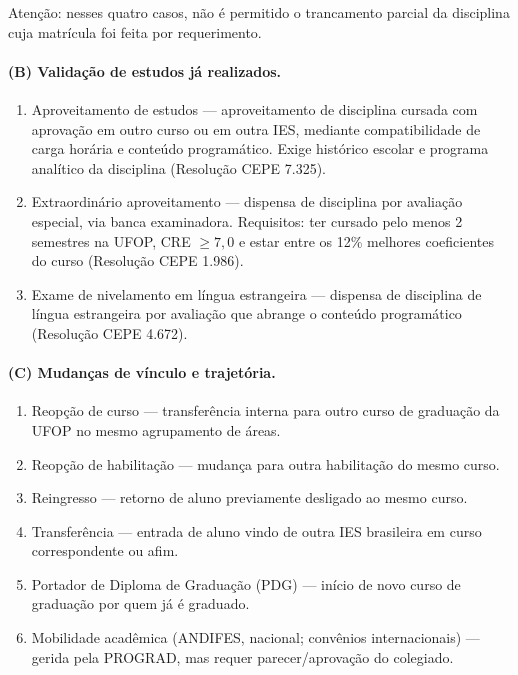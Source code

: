 \documentclass[10pt,a4paper]{extarticle}
\newcommand{\impt}[1]{\textcolor{important}{#1}}
\newcommand{\ntc}[1]{\textcolor{notice}{#1}}
\begin{document}
\ntc{Atenção: nesses quatro casos, \impt{não é permitido o trancamento parcial} da disciplina cuja matrícula foi feita por requerimento.}

\paragraph{(B) Validação de estudos já realizados.}

\begin{enumerate}[label=(\arabic*), resume]
    \item \impt{Aproveitamento de estudos} --- aproveitamento de disciplina cursada com aprovação em outro curso ou em outra IES, mediante compatibilidade de carga horária e conteúdo programático. Exige histórico escolar e programa analítico da disciplina (Resolução CEPE 7.325).
    \item \impt{Extraordinário aproveitamento} --- dispensa de disciplina por avaliação especial, via banca examinadora. Requisitos: ter cursado pelo menos 2 semestres na UFOP, CRE $\geq 7{,}0$ e estar entre os 12\% melhores coeficientes do curso (Resolução CEPE 1.986).
    \item \impt{Exame de nivelamento em língua estrangeira} --- dispensa de disciplina de língua estrangeira por avaliação que abrange o conteúdo programático (Resolução CEPE 4.672).
\end{enumerate}

\paragraph{(C) Mudanças de vínculo e trajetória.}

\begin{enumerate}[label=(\arabic*), resume]
    \item \impt{Reopção de curso} --- transferência interna para outro curso de graduação da UFOP no mesmo agrupamento de áreas.
    \item \impt{Reopção de habilitação} --- mudança para outra habilitação do mesmo curso.
    \item \impt{Reingresso} --- retorno de aluno previamente desligado ao mesmo curso.
    \item \impt{Transferência} --- entrada de aluno vindo de outra IES brasileira em curso correspondente ou afim.
    \item \impt{Portador de Diploma de Graduação (PDG)} --- início de novo curso de graduação por quem já é graduado.
    \item \impt{Mobilidade acadêmica} (ANDIFES, nacional; convênios internacionais) --- gerida pela PROGRAD, mas requer parecer/aprovação do colegiado.
\end{enumerate}
\end{document}
